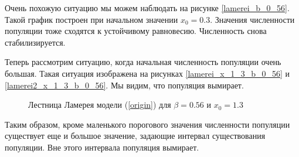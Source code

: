     Очень похожую ситуацию мы можем наблюдать на рисунке \ref{lamerei_b_0_56}. Такой график построен при начальном значении \(x_0 = 0.3\). Значения численности популяции тоже сходятся к устойчивому равновесию. Численность снова стабилизируется.
    
    Теперь рассмотрим ситуацию, когда начальная численность популяции очень большая. Такая ситуация изображена на рисунках \ref{lamerei_x_1_3_b_0_56} и \ref{lamerei2_x_1_3_b_0_56}. Мы видим, что популяция вымирает.

    \begin{figure}
        \centering


        \captionsetup{justification=centering}
        \caption{Лестница Ламерея модели (\ref{origin}) для \(\beta = 0.56\) и \(x_0 = 1.3\)}
    \end{figure}

    Таким образом, кроме маленького порогового значения численности популяции существует еще и большое значение, задающие интервал существования популяции. Вне этого интервала популяция вымирает. 
